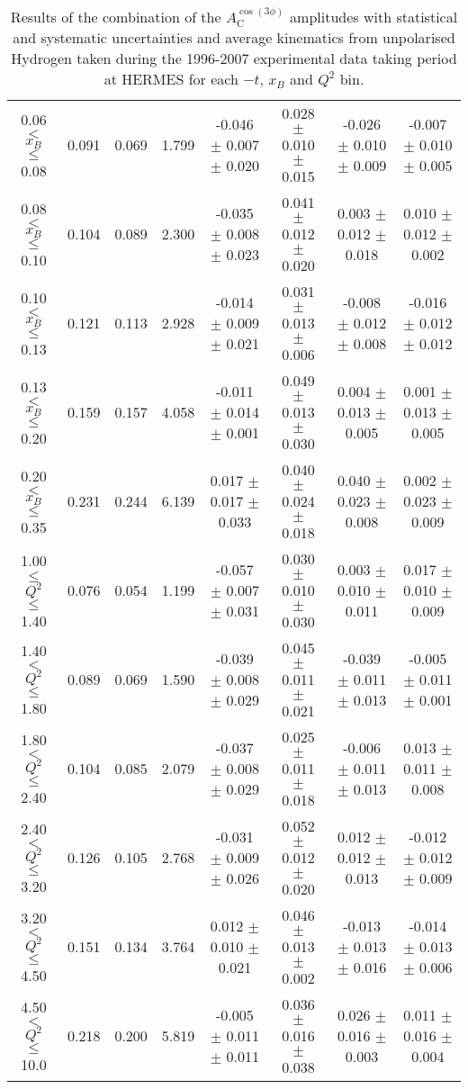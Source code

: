 {\begin{table}[width=15cm]
\begin{center}
{\begin{tabular}{|c|c|c|c|c|c|c|c|}
0.06 $<$ $x_{B}$ $\leqslant$ 0.08 &  0.091 & 0.069 &  1.799 &   -0.046  $\pm$  0.007  $\pm$   0.020 &
0.028  $\pm$  0.010  $\pm$   0.015 & -0.026  $\pm$ 0.010  $\pm$  0.009 & -0.007   $\pm$  0.010   $\pm$   0.005\\
0.08 $<$ $x_{B}$ $\leqslant$ 0.10 &  0.104 & 0.089 &  2.300 &  -0.035  $\pm$  0.008  $\pm$   0.023 & 
0.041  $\pm$  0.012  $\pm$   0.020 & 0.003 $\pm$  0.012 $\pm$    0.018 & 0.010   $\pm$  0.012    $\pm$  0.002\\
0.10 $<$ $x_{B}$ $\leqslant$ 0.13 &  0.121 &  0.113 &  2.928 &  -0.014  $\pm$  0.009  $\pm$   0.021 & 
0.031  $\pm$  0.013 $\pm$   0.006 & -0.008 $\pm$  0.012  $\pm$   0.008 & -0.016   $\pm$  0.012  $\pm$    0.012\\
0.13 $<$ $x_{B}$ $\leqslant$ 0.20 &  0.159 & 0.157 &  4.058&   -0.011   $\pm$ 0.014  $\pm$   0.001 & 
0.049  $\pm$  0.013 $\pm$    0.030 & 0.004  $\pm$  0.013  $\pm$   0.005 & 0.001   $\pm$  0.013   $\pm$  0.005\\
0.20 $<$ $x_{B}$ $\leqslant$ 0.35 &  0.231 & 0.244 &  6.139 &  0.017 $\pm$  0.017   $\pm$  0.033 & 
0.040  $\pm$  0.024   $\pm$  0.018 & 0.040  $\pm$  0.023  $\pm$   0.008 & 0.002  $\pm$   0.023  $\pm$   0.009\\
\hline
1.00 $\leqslant$ $Q^{2}$ $\leqslant$ 1.40 &  0.076 & 0.054  & 1.199 &  -0.057  $\pm$  0.007  $\pm$   0.031 & 
0.030  $\pm$  0.010  $\pm$   0.030 &  0.003 $\pm$  0.010  $\pm$  0.011 & 0.017  $\pm$  0.010   $\pm$   0.009\\
1.40 $<$ $Q^{2}$ $\leqslant$ 1.80 &  0.089 & 0.069 &  1.590 &  -0.039  $\pm$  0.008  $\pm$   0.029 & 
0.045  $\pm$  0.011  $\pm$   0.021 & -0.039  $\pm$  0.011  $\pm$  0.013 & -0.005  $\pm$  0.011   $\pm$  0.001\\
1.80 $<$ $Q^{2}$ $\leqslant$ 2.40 &  0.104 & 0.085 &  2.079 &  -0.037  $\pm$  0.008  $\pm$   0.029 &
 0.025  $\pm$  0.011  $\pm$   0.018 & -0.006 $\pm$   0.011  $\pm$  0.013 & 0.013  $\pm$   0.011  $\pm$  0.008\\
2.40 $<$ $Q^{2}$ $\leqslant$ 3.20 &  0.126 & 0.105  & 2.768 &  -0.031 $\pm$   0.009  $\pm$   0.026 &  
0.052  $\pm$  0.012  $\pm$   0.020 & 0.012  $\pm$  0.012  $\pm$  0.013 & -0.012  $\pm$  0.012  $\pm$  0.009\\
3.20 $<$ $Q^{2}$ $\leqslant$ 4.50 &  0.151 & 0.134 &  3.764 &  0.012  $\pm$  0.010   $\pm$  0.021 & 
0.046 $\pm$   0.013  $\pm$   0.002 & -0.013  $\pm$  0.013 $\pm$ 0.016 & -0.014   $\pm$  0.013  $\pm$  0.006\\
4.50 $<$ $Q^{2}$ $\leqslant$ 10.0 &  0.218 & 0.200 &  5.819 &  -0.005  $\pm$  0.011  $\pm$   0.011 & 
0.036  $\pm$  0.016  $\pm$  0.038 & 0.026 $\pm$   0.016  $\pm$  0.003 & 0.011   $\pm$  0.016   $\pm$   0.004\\
\hline
  \end{tabular}
}
 \end{center}
\caption{Results of the combination of the $A_{\textrm{C}}^{\cos(3\phi)}$  amplitudes with statistical and systematic uncertainties and average kinematics from unpolarised Hydrogen taken during
the 1996-2007 experimental data taking period at HERMES for each $-t$, $x_{B}$ and $Q^{2}$ bin.}
\end{table}
}
